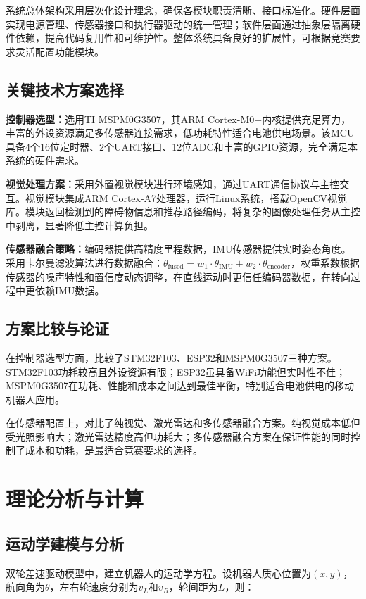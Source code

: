 \documentclass[UTF8]{ctexart}
\begin{document}
	系统总体架构采用层次化设计理念，确保各模块职责清晰、接口标准化。硬件层面实现电源管理、传感器接口和执行器驱动的统一管理；软件层面通过抽象层隔离硬件依赖，提高代码复用性和可维护性。整体系统具备良好的扩展性，可根据竞赛要求灵活配置功能模块。
	
	\subsection{关键技术方案选择}
	\textbf{控制器选型：}选用TI MSPM0G3507，其ARM Cortex-M0+内核提供充足算力，丰富的外设资源满足多传感器连接需求，低功耗特性适合电池供电场景。该MCU具备4个16位定时器、2个UART接口、12位ADC和丰富的GPIO资源，完全满足本系统的硬件需求。
	
	\textbf{视觉处理方案：}采用外置视觉模块进行环境感知，通过UART通信协议与主控交互。视觉模块集成ARM Cortex-A7处理器，运行Linux系统，搭载OpenCV视觉库。模块返回检测到的障碍物信息和推荐路径编码，将复杂的图像处理任务从主控中剥离，显著降低主控计算负担。
	
	\textbf{传感器融合策略：}编码器提供高精度里程数据，IMU传感器提供实时姿态角度。采用卡尔曼滤波算法进行数据融合：$\theta_{\text{fused}} = w_1 \cdot \theta_{\text{IMU}} + w_2 \cdot \theta_{\text{encoder}}$，权重系数根据传感器的噪声特性和置信度动态调整，在直线运动时更信任编码器数据，在转向过程中更依赖IMU数据。
	
	\subsection{方案比较与论证}
	在控制器选型方面，比较了STM32F103、ESP32和MSPM0G3507三种方案。STM32F103功耗较高且外设资源有限；ESP32虽具备WiFi功能但实时性不佳；MSPM0G3507在功耗、性能和成本之间达到最佳平衡，特别适合电池供电的移动机器人应用。
	
	在传感器配置上，对比了纯视觉、激光雷达和多传感器融合方案。纯视觉成本低但受光照影响大；激光雷达精度高但功耗大；多传感器融合方案在保证性能的同时控制了成本和功耗，是最适合竞赛要求的选择。
	
	\section{理论分析与计算}
	
	\subsection{运动学建模与分析}
	双轮差速驱动模型中，建立机器人的运动学方程。设机器人质心位置为$(x, y)$，航向角为$\theta$，左右轮速度分别为$v_L$和$v_R$，轮间距为$L$，则：
	
\end{document}

